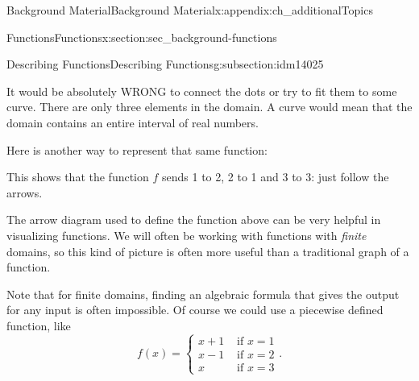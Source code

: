 \documentclass[oneside,10pt,]{book}
\numberwithin{equation}{chapter}
\newcommand{\amp}{&}
\begin{document}
\begin{appendixptx}{Background Material}{}{Background Material}{}{}{x:appendix:ch_additionalTopics}
\begin{sectionptx}{Functions}{}{Functions}{}{}{x:section:sec_background-functions}
\begin{subsectionptx}{Describing Functions}{}{Describing Functions}{}{}{g:subsection:idm14025}
\begin{sidebyside}{1}{0.35}{0.35}{0}%
\begin{sbspanel}{0.3}%
%
\end{sbspanel}%
\end{sidebyside}%
\par
It would be absolutely WRONG to connect the dots or try to fit them to some curve. There are only three elements in the domain. A curve would mean that the domain contains an entire interval of real numbers.%
\par
Here is another way to represent that same function:%
\begin{sidebyside}{1}{0.415}{0.415}{0}%
\begin{sbspanel}{0.17}%
%
\end{sbspanel}%
\end{sidebyside}%
\par
This shows that the function \(f\) sends 1 to 2, 2 to 1 and 3 to 3: just follow the arrows.%
\par
The arrow diagram used to define the function above can be very helpful in visualizing functions. We will often be working with functions with \emph{finite} domains, so this kind of picture is often more useful than a traditional graph of a function.%
\par
Note that for finite domains, finding an algebraic formula that gives the output for any input is often impossible.  Of course we could use a piecewise defined function, like%
\begin{equation*}
f(x) = \begin{cases} x+1 \amp \text{ if } x = 1 \\ x-1 \amp \text{ if } x = 2 \\ x \amp \text{ if } x = 3\end{cases}.
\end{equation*}

\end{subsectionptx}
\end{sectionptx}
\end{appendixptx}
\end{document}
